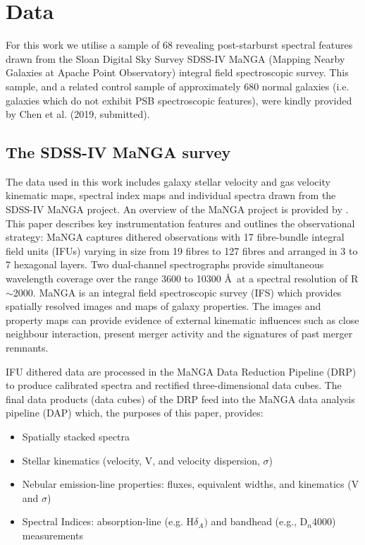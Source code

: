 \section{Data}
\label{sec:data}

For this work we utilise a sample of 68 revealing post-starburst spectral features drawn from the Sloan Digital Sky Survey SDSS-IV MaNGA (Mapping Nearby Galaxies at Apache Point Observatory) integral field spectroscopic survey. This sample, and a related control sample of approximately 680 normal galaxies (i.e. galaxies which do not exhibit PSB spectroscopic features),  were kindly provided by Chen et al. (2019, submitted).

\subsection{The SDSS-IV MaNGA survey}
\label{sec:MaNGA}
The data used in this work includes galaxy stellar velocity and gas velocity kinematic maps, spectral index maps and individual spectra drawn from the SDSS-IV MaNGA project. An overview of the MaNGA project is provided by \citet{2015ApJ...798....7B}. This paper describes key instrumentation features and outlines the observational strategy: MaNGA captures dithered observations with 17 fibre-bundle integral
field units (IFUs) varying in size from 19 fibres to 127 fibres and arranged in 3 to 7 hexagonal layers. Two dual-channel spectrographs provide
simultaneous wavelength coverage over the range 3600 to 10300 \AA\ at a spectral resolution of R$\sim$2000. MaNGA is an integral field spectroscopic survey (IFS) which provides spatially resolved images and maps of galaxy properties. The images and property maps can provide evidence of external kinematic influences such as close neighbour interaction, present merger activity and the signatures of past merger remnants.

IFU dithered data are processed in the MaNGA Data Reduction Pipeline (DRP) to produce calibrated spectra and rectified three-dimensional data cubes. The final data products (data cubes) of the DRP feed into the MaNGA data analysis pipeline (DAP) \citep{2016AJ....152...83L,2019arXiv190100856W} which, the purposes of this paper, provides:
\begin{itemize}
    \item Spatially stacked spectra
    \item Stellar kinematics (velocity, V, and velocity dispersion, $\sigma$)
    \item Nebular emission-line properties: fluxes, equivalent widths, and kinematics (V and $\sigma$)
    \item Spectral Indices: absorption-line (e.g.  H$\delta_A)$ and bandhead (e.g., D$_n$4000) measurements
\end{itemize}

